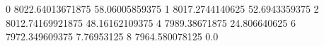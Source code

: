 0 8022.64013671875 58.06005859375
1 8017.2744140625 52.6943359375
2 8012.74169921875 48.16162109375
4 7989.38671875 24.806640625
6 7972.349609375 7.76953125
8 7964.580078125 0.0
